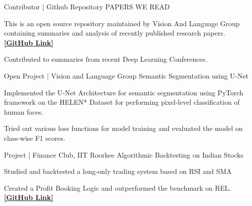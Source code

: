 \begin{cventries}
\cventry
{Contributor | Github Repository} %
{PAPERS WE READ} %
{} %
{} %
{
	\begin{cvitems} %
		\item {This is an open source repository maintained by Vision And Language Group containing summaries and analysis of recently published research papers. {\href{https://github.com/vlgiitr/papers_we_read}{\bf [GitHub Link]}}}
		\item {Contributed to summaries from recent Deep Learning Conferences.}
	\end{cvitems}
}


\cventry
{Open Project | Vision and Language Group} %
{Semantic Segmentation using U-Net} %
{} %
{} %
{
	\begin{cvitems} %
		\item {Implemented the U‑Net Architecture for semantic segmentation using PyTorch framework on the HELEN* Dataset for performing pixel‑level classification of human faces.}
	 	\item {Tried out various loss functions for model training and evaluated the model on class‑wise F1 scores.}
	\end{cvitems}
}

\cventry
{Project | Finance Club, IIT Roorkee} %
{Algorithmic Backtesting on Indian Stocks} %
{} %
{} %
{
	\begin{cvitems} %
		\item {Studied and backtested a long-only trading system based on RSI and SMA}
		\item {Created a Profit Booking Logic and outperformed the benchmark on REL. {\href{https://github.com/ChanBong/finance_projects}{\bf [GitHub Link]}}}
	\end{cvitems}
}
    




\end{cventries}